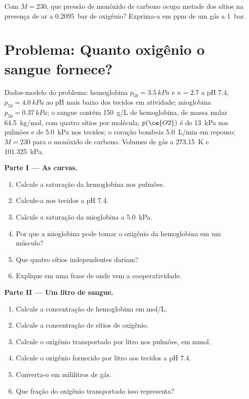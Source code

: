 \begin{exercise}[$\star\star\star$]\label{exo:b3:bioinorganic:12}
Com $M = 230$, que pressão de monóxido de carbono ocupa metade dos sítios na
presença de ar a \qty{0.2095}{bar} de oxigênio? Exprima-a em ppm de um gás a \qty{1}{bar}.
\end{exercise}

\section{Problema: Quanto oxigênio o sangue fornece?}

\begin{problem}
\label{pb:b3:bioinorganic:1}
Dados-modelo do problema: hemoglobina $p_{50} = \qty{3.5}{kPa}$ e $n = 2.7$ a pH 7.4, $p_{50} = \qty{4.0}{kPa}$ ao
pH mais baixo dos tecidos em atividade; mioglobina $p_{50} = \qty{0.37}{kPa}$; o sangue contém \qty{150}{g/L} de
hemoglobina, de massa molar \qty{64.5}{kg/mol}, com quatro sítios por molécula; $p(\ce{O2})$ é de \qty{13}{kPa}
nos pulmões e de \qty{5.0}{kPa} nos tecidos; o coração bombeia \qty{5.0}{L/min} em repouso;
$M = 230$ para o monóxido de carbono. Volumes de gás a \qty{273.15}{K} e \qty{101.325}{kPa}.

\medskip\noindent\textbf{Parte I --- As curvas.}
\begin{enumerate}
  \item Calcule a saturação da hemoglobina nos pulmões.
  \item Calcule-a nos tecidos a pH 7.4.
  \item Calcule a saturação da mioglobina a \qty{5.0}{kPa}.
  \item Por que a mioglobina pode tomar o oxigênio da hemoglobina em um músculo?
  \item Que  quatro sítios independentes dariam?
  \item Explique em uma frase de onde vem a cooperatividade.
\end{enumerate}

\medskip\noindent\textbf{Parte II --- Um litro de sangue.}
\begin{enumerate}[resume]
  \item Calcule a concentração de hemoglobina em mol/L.
  \item Calcule a concentração de sítios de oxigênio.
  \item Calcule o oxigênio transportado por litro nos pulmões, em mmol.
  \item Calcule o oxigênio fornecido por litro aos tecidos a pH 7.4.
  \item Converta-o em mililitros de gás.
  \item Que fração do oxigênio transportado isso representa?
\end{enumerate}


\end{problem}
